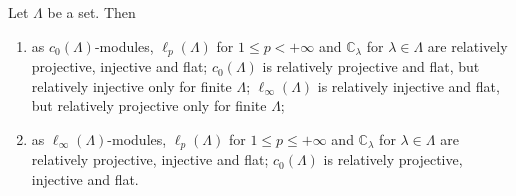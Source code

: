 \begin{proposition}\label{c0AndlInftyModsRelTh} Let $\Lambda$ be a set. Then

\begin{enumerate}[label = (\roman*)]
    \item as $c_0(\Lambda)$-modules, $\ell_p(\Lambda)$ for $1\leq p<+\infty$ and
    $\mathbb{C}_\lambda$ for $\lambda\in\Lambda$ are relatively projective,
    injective and flat; $c_0(\Lambda)$ is relatively projective and flat, but
    relatively injective only for finite $\Lambda$; $\ell_\infty(\Lambda)$ is
    relatively injective and flat, but relatively projective only for finite
    $\Lambda$;

    \item as $\ell_\infty(\Lambda)$-modules, $\ell_p(\Lambda)$ for 
    $1\leq p\leq+\infty$ and $\mathbb{C}_\lambda$ for $\lambda\in\Lambda$ 
    are relatively projective, injective and flat; $c_0(\Lambda)$ is 
    relatively projective, injective and flat.
\end{enumerate}
\end{proposition}
